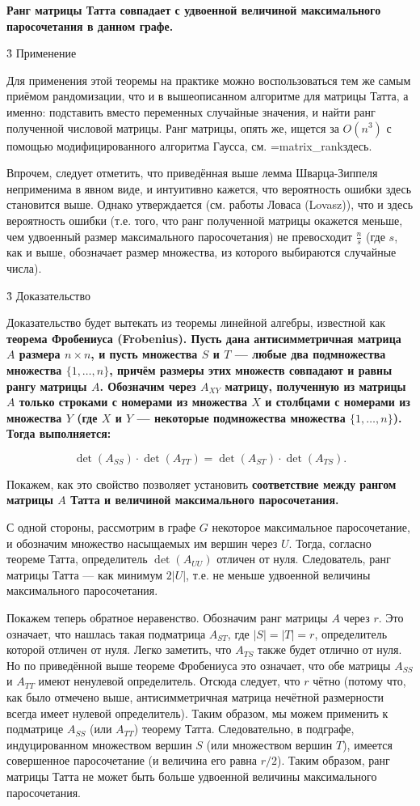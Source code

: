 \bf{Ранг} матрицы Татта совпадает с удвоенной величиной \bf{максимального паросочетания} в данном графе.


\h3{ Применение }

Для применения этой теоремы на практике можно воспользоваться тем же самым приёмом рандомизации, что и в вышеописанном алгоритме для матрицы Татта, а именно: подставить вместо переменных случайные значения, и найти ранг полученной числовой матрицы. Ранг матрицы, опять же, ищется за $O (n^3)$ с помощью модифицированного алгоритма Гаусса, см. \algohref=matrix_rank{здесь}.

Впрочем, следует отметить, что приведённая выше лемма Шварца-Зиппеля неприменима в явном виде, и интуитивно кажется, что вероятность ошибки здесь становится выше. Однако утверждается (см. работы Ловаса (Lovasz)), что и здесь вероятность ошибки (т.е. того, что ранг полученной матрицы окажется меньше, чем удвоенный размер максимального паросочетания) не превосходит $\frac{n}{s}$ (где $s$, как и выше, обозначает размер множества, из которого выбираются случайные числа).


\h3{ Доказательство }

Доказательство будет вытекать из теоремы линейной алгебры, известной как \bf{теорема Фробениуса} (Frobenius). Пусть дана антисимметричная матрица $A$ размера $n \times n$, и пусть множества $S$ и $T$ --- любые два подмножества множества $\{ 1, \ldots, n \}$, причём размеры этих множеств совпадают и равны рангу матрицы $A$. Обозначим через $A_{XY}$ матрицу, полученную из матрицы $A$ только строками с номерами из множества $X$ и столбцами с номерами из множества $Y$ (где $X$ и $Y$ --- некоторые подмножества множества $\{ 1, \ldots, n \}$). Тогда выполняется:

$$ \det(A_{SS}) \cdot \det(A_{TT}) = \det(A_{ST}) \cdot \det(A_{TS}). $$

Покажем, как это свойство позволяет установить \bf{соответствие} между рангом матрицы $A$ Татта и величиной максимального паросочетания.

С одной стороны, рассмотрим в графе $G$ некоторое максимальное паросочетание, и обозначим множество насыщаемых им вершин через $U$. Тогда, согласно теореме Татта, определитель $\det(A_{UU})$ отличен от нуля. Следователь, ранг матрицы Татта --- как минимум $2|U|$, т.е. не меньше удвоенной величины максимального паросочетания.

Покажем теперь обратное неравенство. Обозначим ранг матрицы $A$ через $r$. Это означает, что нашлась такая подматрица $A_{ST}$, где $|S| = |T| = r$, определитель которой отличен от нуля. Легко заметить, что $A_{TS}$ также будет отлично от нуля. Но по приведённой выше теореме Фробениуса это означает, что обе матрицы $A_{SS}$ и $A_{TT}$ имеют ненулевой определитель. Отсюда следует, что $r$ чётно (потому что, как было отмечено выше, антисимметричная матрица нечётной размерности всегда имеет нулевой определитель). Таким образом, мы можем применить к подматрице $A_{SS}$ (или $A_{TT}$) теорему Татта. Следовательно, в подграфе, индуцированном множеством вершин $S$ (или множеством вершин $T$), имеется совершенное паросочетание (и величина его равна $r/2$). Таким образом, ранг матрицы Татта не может быть больше удвоенной величины максимального паросочетания.

